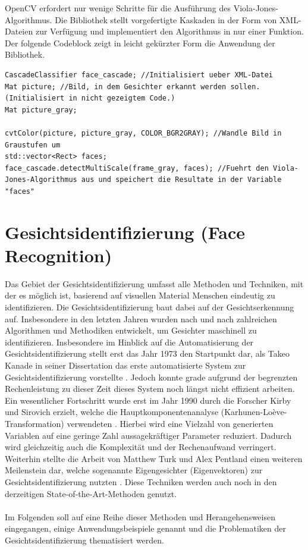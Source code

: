 \documentclass[doktyp=semarbeit, sprache=german]{TUBAFarbeiten}
\begin{document}
OpenCV erfordert nur wenige Schritte für die Ausführung des Viola-Jones-Algorithmus. Die Bibliothek stellt vorgefertigte Kaskaden in der Form von XML-Dateien zur Verfügung und implementiert den Algorithmus in nur einer Funktion. Der folgende Codeblock zeigt in leicht gekürzter Form die Anwendung der Bibliothek.

\begin{lstlisting}
CascadeClassifier face_cascade; //Initialisiert ueber XML-Datei
Mat picture; //Bild, in dem Gesichter erkannt werden sollen. (Initialisiert in nicht gezeigtem Code.)
Mat picture_gray;

cvtColor(picture, picture_gray, COLOR_BGR2GRAY); //Wandle Bild in Graustufen um
std::vector<Rect> faces;
face_cascade.detectMultiScale(frame_gray, faces); //Fuehrt den Viola-Jones-Algorithmus aus und speichert die Resultate in der Variable "faces"
\end{lstlisting}


\section{Gesichtsidentifizierung (Face Recognition)}
\label{identifizierung}
Das Gebiet der Gesichtsidentifizierung umfasst alle Methoden und Techniken, mit der es möglich ist, basierend auf visuellen Material Menschen eindeutig zu identifizieren. Die Gesichtsidentifizierung baut dabei auf der Gesichtserkennung auf. Insbesondere in den letzten Jahren wurden nach und nach zahlreichen Algorithmen und Methodiken entwickelt, um Gesichter maschinell zu identifizieren. Insbesondere im Hinblick auf die Automatisierung der Gesichtsidentifizierung stellt erst das Jahr 1973 den Startpunkt dar, als Takeo Kanade in seiner Dissertation das erste automatisierte System zur Gesichtsidentifizierung vorstellte \cite{Takeo}. Jedoch konnte grade aufgrund der begrenzten Rechenleistung zu dieser Zeit dieses System noch längst nicht effizient arbeiten. Ein wesentlicher Fortschritt wurde erst im Jahr 1990 durch die Forscher Kirby und Sirovich erzielt, welche die Hauptkomponentenanalyse (Karhunen-Loève-Transformation) verwendeten \cite{Kirby}. Hierbei wird eine Vielzahl von generierten Variablen auf eine geringe Zahl aussagekräftiger Parameter reduziert. Dadurch wird gleichzeitig auch die Komplexität und der Rechenaufwand verringert. Weiterhin stellte die Arbeit von Matthew Turk und Alex Pentland einen weiteren Meilenstein dar, welche sogenannte Eigengesichter (Eigenvektoren) zur Gesichtsidentifizierung nutzten \cite{Turk}. Diese Techniken werden auch noch in den derzeitigen State-of-the-Art-Methoden genutzt.
\\\\Im Folgenden soll auf eine Reihe dieser Methoden und Herangehensweisen eingegangen, einige Anwendungsbeispiele genannt und die Problematiken der Gesichtsidentifizierung thematisiert werden.
\end{document}
